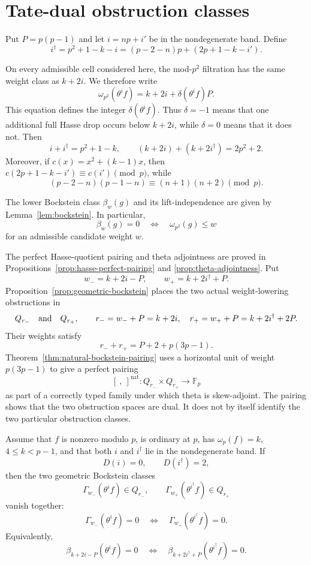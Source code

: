 
\section{Tate-dual obstruction classes}

Put $P=p(p-1)$ and let $i=np+i'$ be in the nondegenerate band. Define
\[
  i^\dagger=p^2+1-k-i
   =(p-2-n)p+(2p+1-k-i').
\]

On every admissible cell considered here, the mod-$p^2$ filtration has the
same weight class as $k+2i$.  We therefore write
\[
 \omega_{p^2}(\theta^if)=k+2i+\delta(\theta^if)P.
\]
This equation defines the integer $\delta(\theta^if)$.  Thus
$\delta=-1$ means that one additional full Hasse drop occurs below
$k+2i$, while $\delta=0$ means that it does not.
Then
\[
 i+i^\dagger=p^2+1-k,
 \qquad
 (k+2i)+(k+2i^\dagger)=2p^2+2.
\]
Moreover, if $c(x)=x^2+(k-1)x$, then
$c(2p+1-k-i')\equiv c(i')\pmod p$, while
\[
 (p-2-n)(p-1-n)\equiv(n+1)(n+2)\pmod p.
\]

The lower Bockstein class $\beta_w(g)$ and its lift-independence are given
by Lemma~\ref{lem:bockstein}. In particular,
\[
  \beta_w(g)=0
  \quad\Longleftrightarrow\quad
  \omega_{p^2}(g)\le w
\]
for an admissible candidate weight $w$.

The perfect Hasse-quotient pairing and theta adjointness are proved in
Propositions~\ref{prop:hasse-perfect-pairing} and
\ref{prop:theta-adjointness}. Put
\[
 w_-=k+2i-P,\qquad w_+=k+2i^\dagger+P.
\]
Proposition~\ref{prop:geometric-bockstein} places the two actual
weight-lowering obstructions in
\[
 Q_{r_-}\quad\hbox{and}\quad Q_{r_+},
 \qquad
 r_-=w_-+P=k+2i,
 \quad
 r_+=w_++P=k+2i^\dagger+2P.
\]
Their weights satisfy
\[
 r_-+r_+=P+2+p(3p-1).
\]
Theorem~\ref{thm:natural-bockstein-pairing} uses a horizontal unit of
weight $p(3p-1)$ to give a perfect pairing
\[
 [\ ,\ ]^{\mathrm{nat}}:
 Q_{r_-}\times Q_{r_+}\longrightarrow\mathbb F_p
\]
as part of a correctly typed family under which theta is skew-adjoint.
The pairing shows that the two obstruction spaces are dual.  It does not
by itself identify the two particular obstruction classes.

\begin{conjecture}
\label{conj:cross-wedge-bockstein}
Assume that $f$ is nonzero modulo $p$, is ordinary at $p$, has
$\omega_p(f)=k$, $4\le k<p-1$, and that both $i$ and $i^\dagger$ lie in
the nondegenerate band. If
\[
 D(i)=0,\qquad D(i^\dagger)=2,
\]
then the two geometric Bockstein classes
\[
 \Gamma_{w_-}(\theta^if)\in Q_{r_-},
 \qquad
 \Gamma_{w_+}(\theta^{i^\dagger}f)\in Q_{r_+}
\]
vanish together:
\[
 \Gamma_{w_-}(\theta^if)=0
 \quad\Longleftrightarrow\quad
 \Gamma_{w_+}(\theta^{i^\dagger}f)=0.
\]
Equivalently,
\[
 \beta_{k+2i-P}(\theta^i f)=0
 \quad\Longleftrightarrow\quad
 \beta_{k+2i^\dagger+P}(\theta^{i^\dagger}f)=0.
\]
\end{conjecture}

